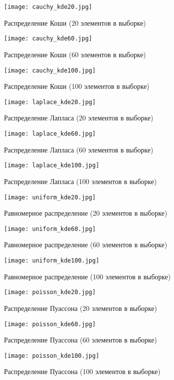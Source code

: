 \documentclass[main.tex]{subfiles}
\begin{document}
\begin{figure}[H]
	\centering \texttt{[image: cauchy\_kde20.jpg]}
	\caption{Распределение Коши (20 элементов в выборке)}
	\label{img:cauchy_kde20}
\end{figure}
\begin{figure}[H]
	\centering \texttt{[image: cauchy\_kde60.jpg]}
	\caption{Распределение Коши (60 элементов в выборке)}
	\label{img:cauchy_kde60}
\end{figure}
\begin{figure}[H]
	\centering \texttt{[image: cauchy\_kde100.jpg]}
	\caption{Распределение Коши (100 элементов в выборке)}
	\label{img:cauchy_kde100}
\end{figure}

\begin{figure}[H]
	\centering \texttt{[image: laplace\_kde20.jpg]}
	\caption{Распределение Лапласа (20 элементов в выборке)}
	\label{img:laplace_kde20}
\end{figure}
\begin{figure}[H]
	\centering \texttt{[image: laplace\_kde60.jpg]}
	\caption{Распределение Лапласа (60 элементов в выборке)}
	\label{img:laplace_kde60}
\end{figure}
\begin{figure}[H]
	\centering \texttt{[image: laplace\_kde100.jpg]}
	\caption{Распределение Лапласа (100 элементов в выборке)}
	\label{img:laplace_kde100}
\end{figure}

\begin{figure}[H]
	\centering \texttt{[image: uniform\_kde20.jpg]}
	\caption{Равномерное распределение (20 элементов в выборке)}
	\label{img:uniform_kde20}
\end{figure}
\begin{figure}[H]
	\centering \texttt{[image: uniform\_kde60.jpg]}
	\caption{Равномерное распределение (60 элементов в выборке)}
	\label{img:uniform_kde60}
\end{figure}
\begin{figure}[H]
	\centering \texttt{[image: uniform\_kde100.jpg]}
	\caption{Равномерное распределение (100 элементов в выборке)}
	\label{img:uniform_kde100}
\end{figure}

\begin{figure}[H]
	\centering \texttt{[image: poisson\_kde20.jpg]}
	\caption{Распределение Пуассона (20 элементов в выборке)}
	\label{img:poisson_kde20}
\end{figure}
\begin{figure}[H]
	\centering \texttt{[image: poisson\_kde60.jpg]}
	\caption{Распределение Пуассона (60 элементов в выборке)}
	\label{img:poisson_kde60}
\end{figure}
\begin{figure}[H]
	\centering \texttt{[image: poisson\_kde100.jpg]}
	\caption{Распределение Пуассона (100 элементов в выборке)}
	\label{img:poisson_kde100}
\end{figure}
	
\end{document}
